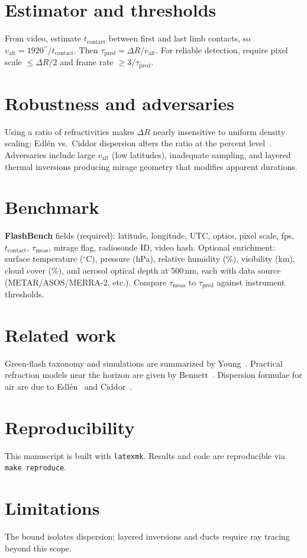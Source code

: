 \documentclass[11pt]{article}
\newcommand{\arcsec}{\ensuremath{^{\prime\prime}}}
\begin{document}
\section{Estimator and thresholds}
From video, estimate $t_{\mathrm{contact}}$ between first and last limb contacts, so $v_{\mathrm{alt}}=1920\arcsec/t_{\mathrm{contact}}$. Then $\tau_{\mathrm{pred}}=\Delta R/v_{\mathrm{alt}}$. For reliable detection, require pixel scale $\le \Delta R/2$ and frame rate $\ge 3/\tau_{\mathrm{pred}}$.

\section{Robustness and adversaries}
Using a ratio of refractivities makes $\Delta R$ nearly insensitive to uniform density scaling; Edl\'en vs.\ Ciddor dispersion alters the ratio at the percent level~\cite{Edlen1966,Ciddor1996}. Adversaries include large $v_{\mathrm{alt}}$ (low latitudes), inadequate sampling, and layered thermal inversions producing mirage geometry that modifies apparent durations.

\section{Benchmark}
\textbf{FlashBench} fields (required): latitude, longitude, UTC, optics, pixel scale, fps, $t_{\mathrm{contact}}$, $\tau_{\mathrm{meas}}$, mirage flag, radiosonde ID, video hash.
Optional enrichment: surface temperature ($^\circ$C), pressure (hPa), relative humidity (\%), visibility (km), cloud cover (\%), and aerosol optical depth at 500\,nm, each with data source (METAR/ASOS/MERRA-2, etc.). Compare $\tau_{\mathrm{meas}}$ to $\tau_{\mathrm{pred}}$ against instrument thresholds.

\section{Related work}
Green-flash taxonomy and simulations are summarized by Young~\cite{YoungJOSA,YoungSim}. Practical refraction models near the horizon are given by Bennett~\cite{Bennett1982}. Dispersion formulae for air are due to Edl\'en~\cite{Edlen1966} and Ciddor~\cite{Ciddor1996}.

\section{Reproducibility}
This manuscript is built with \texttt{latexmk}. Results and code are reproducible via \texttt{make reproduce}.

\section{Limitations}
The bound isolates dispersion; layered inversions and ducts require ray tracing beyond this scope.



\end{document}

